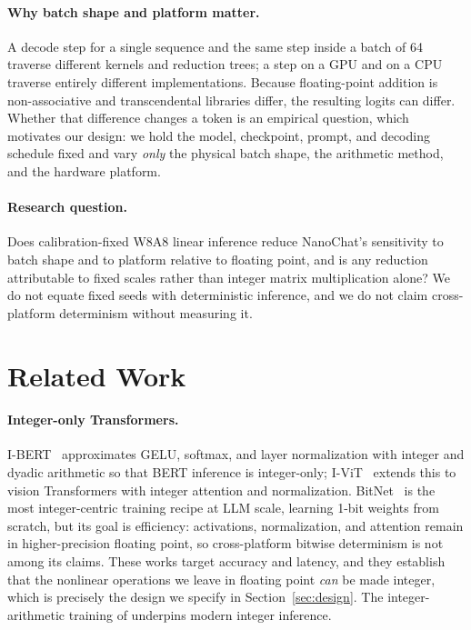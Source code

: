 \documentclass[wcp]{jmlr}
\begin{document}
\paragraph{Why batch shape and platform matter.} A decode step for a single sequence
and the same step inside a batch of 64 traverse different kernels and reduction
trees; a step on a GPU and on a CPU traverse entirely different implementations.
Because floating-point addition is non-associative and transcendental libraries
differ, the resulting logits can differ. Whether that difference changes a token is
an empirical question, which motivates our design: we hold the model, checkpoint,
prompt, and decoding schedule fixed and vary \emph{only} the physical batch shape,
the arithmetic method, and the hardware platform.

\paragraph{Research question.} Does calibration-fixed W8A8 linear inference reduce
NanoChat's sensitivity to batch shape and to platform relative to floating point,
and is any reduction attributable to fixed scales rather than integer matrix
multiplication alone? We do not equate fixed seeds with deterministic inference, and
we do not claim cross-platform determinism without measuring it.

\section{Related Work}
\paragraph{Integer-only Transformers.} I-BERT~\citep{kim2021ibert} approximates
GELU, softmax, and layer normalization with integer and dyadic arithmetic so that
BERT inference is integer-only; I-ViT~\citep{li2023ivit} extends this to vision
Transformers with integer attention and normalization.
BitNet~\citep{wang2023bitnet} is the most integer-centric training recipe at LLM
scale, learning 1-bit weights from scratch, but its goal is efficiency:
activations, normalization, and attention remain in higher-precision floating
point, so cross-platform bitwise determinism is not among its claims. These works
target accuracy and latency, and they establish that the nonlinear operations we
leave in floating point \emph{can} be made integer, which is precisely the design
we specify in Section~\ref{sec:design}. The integer-arithmetic training of
\citet{jacob2018quantization} underpins modern integer inference.
\end{document}

